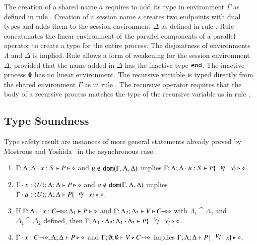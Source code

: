 The creation of a
shared name $a$ requires to add
its type in environment $\Gamma$ as defined in 
rule . 
Creation of a session name $s$
creates two endpoints with dual types and adds them to
the session environment 
$\Delta$ as defined in rule . 
Rule  concatanates the linear environment of
the parallel components of a parallel operator
to create a type for the entire process.
The disjointness of environments $\Lambda$ and $\Delta$
is implied. Rule  allows a form of weakening 
for the session environment $\Delta$, provided that
the name added in $\Delta$ has the inactive
type $\mathtt{end}$. The inactive process $\mathbf{0}$ has no
linear environment. The recursive variable is typed
directly from the shared environment $\Gamma$ as
in rule .
The recursive operator requires that the body of
a recursive process matches the type of the recursive
variable as in rule .

\subsection{Type Soundness}

Type safety result are instances of more general statements already proved by
Mostrous and Yoshida~\cite{tlca07} in the asynchronous case.

\begin{lemma}\rm
	\label{lem:subst}
	\begin{enumerate}[1.]
		\item	$\Gamma; \Lambda; \Delta \cdot x:S  \vdash P \triangleright \diamond$ and
			$u \not\in \mathtt{dom}(\Gamma, \Lambda, \Delta)$
			implies
			$\Gamma; \Lambda; \Delta \cat u:S  \proves P\subst{u}{x} \hastype \Proc$.

		\item	$\Gamma \cdot x:\langle U \rangle; \Lambda; \Delta \vdash P \triangleright \diamond$ and
			$a \notin \mathtt{dom}(\Gamma, \Lambda, \Delta)$
			implies
			$\Gamma \cat a:\chtype{U}; \Lambda; \Delta \proves P\subst{a}{x} \hastype \Proc$.

		\item	If $\Gamma; \Lambda_1 \cdot x:C\!\! \multimap\!\! \diamond; \Delta_1  \vdash P \triangleright \diamond$ 
			and $\Gamma; \Lambda_2; \Delta_2  \vdash V \triangleright C\!\! \multimap\!\! \diamond$ with 
			$\Lambda_1 \cat \Lambda_2$ and $\Delta_1 \cat \Delta_2$ defined,
			then $\Gamma; \Lambda_1 \cat \Lambda_2; \Delta_1 \cat \Delta_2  \proves P\subst{V}{x} \hastype \Proc$.

		\item	$\Gamma \cdot x:C\!\! \rightarrow\!\! \diamond; \Lambda; \Delta  \vdash P \triangleright \diamond$ and
			$\Gamma; \emptyset ; \emptyset \vdash V \triangleright C\!\! \rightarrow\!\! \diamond$
			implies
			$\Gamma; \Lambda; \Delta \proves P\subst{V}{x} \hastype \Proc$.
		\end{enumerate}
\end{lemma}

